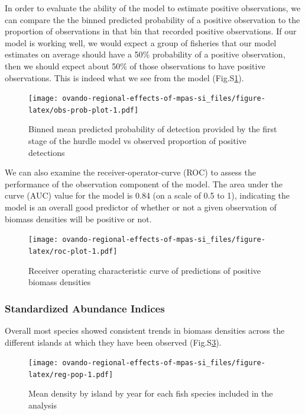 \documentclass[]{article}
\begin{document}
In order to evaluate the ability of the model to estimate positive observations, we can compare the the binned predicted probability of a positive observation to the proportion of observations in that bin that recorded positive observations. If our model is working well, we would expect a group of fisheries that our model estimates on average should have a 50\% probability of a positive observation, then we should expect about 50\% of those observations to have positive observations. This is indeed what we see from the model (Fig.S\ref{fig:obs-prob-plot}).

\begin{figure}
\centering
\texttt{[image: ovando-regional-effects-of-mpas-si\_files/figure-latex/obs-prob-plot-1.pdf]}
\caption{\label{fig:obs-prob-plot}Binned mean predicted probability of detection provided by the first stage of the hurdle model vs observed proportion of positive detections}
\end{figure}

We can also examine the receiver-operator-curve (ROC) to assess the performance of the observation component of the model. The area under the curve (AUC) value for the model is 0.84 (on a scale of 0.5 to 1), indicating the model is an overall good predictor of whether or not a given observation of biomass densities will be positive or not.

\begin{figure}
\centering
\texttt{[image: ovando-regional-effects-of-mpas-si\_files/figure-latex/roc-plot-1.pdf]}
\caption{\label{fig:roc-plot}Receiver operating characteristic curve of predictions of positive biomass densities}
\end{figure}

\hypertarget{standardized-abundance-indices}{%
\subsubsection{Standardized Abundance Indices}\label{standardized-abundance-indices}}

Overall most species showed consistent trends in biomass densities across the different islands at which they have been observed (Fig.S\ref{fig:reg-pop}).

\begin{figure}
\centering
\texttt{[image: ovando-regional-effects-of-mpas-si\_files/figure-latex/reg-pop-1.pdf]}
\caption{\label{fig:reg-pop}Mean density by island by year for each fish species included in the analysis}
\end{figure}
\end{document}
